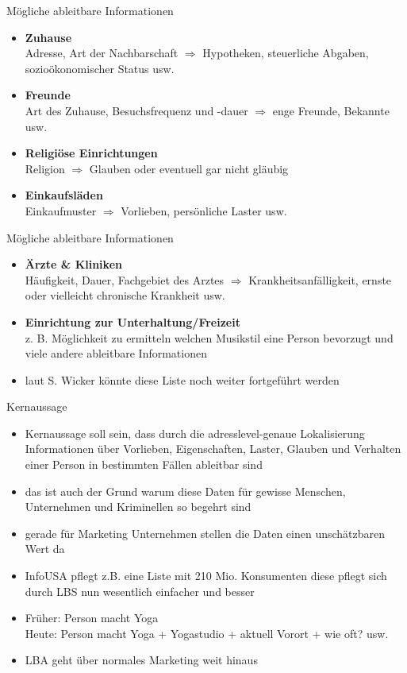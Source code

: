 \begin{frame}{Mögliche ableitbare Informationen}
  \begin{itemize}
  \item \textbf{Zuhause}\\
  Adresse, Art der Nachbarschaft $\Rightarrow$ Hypotheken, steuerliche Abgaben, sozioökonomischer Status usw.
  \item \textbf{Freunde}\\
  Art des Zuhause, Besuchsfrequenz und -dauer $\Rightarrow$ enge Freunde, Bekannte usw.
  \item \textbf{Religiöse Einrichtungen}\\
  Religion $\Rightarrow$ Glauben oder eventuell gar nicht gläubig
  \item \textbf{Einkaufsläden}\\
  Einkaufmuster $\Rightarrow$ Vorlieben, persönliche Laster usw.
  \end{itemize}
\end{frame}

\begin{frame}{Mögliche ableitbare Informationen}
  \begin{itemize}
  \item \textbf{Ärzte \& Kliniken}\\
  Häufigkeit, Dauer, Fachgebiet des Arztes $\Rightarrow$ Krankheitsanfälligkeit, ernste oder
  vielleicht chronische Krankheit usw.
  \item \textbf{Einrichtung zur Unterhaltung/Freizeit}\\
  z. B. Möglichkeit zu ermitteln welchen Musikstil eine Person bevorzugt und viele andere ableitbare Informationen
  \item laut S. Wicker könnte diese Liste noch weiter fortgeführt werden
  \end{itemize}
\end{frame}

\begin{frame}{Kernaussage}
  \begin{itemize}
  \item Kernaussage soll sein, dass durch die adresslevel-genaue Lokalisierung Informationen über Vorlieben,
  Eigenschaften, Laster, Glauben und Verhalten einer Person in bestimmten Fällen ableitbar sind
  \item das ist auch der Grund warum diese Daten für gewisse Menschen, Unternehmen und Kriminellen so begehrt sind
  \item gerade für Marketing Unternehmen stellen die Daten einen unschätzbaren Wert da
  \item InfoUSA pflegt z.B. eine Liste mit 210 Mio. Konsumenten diese pflegt sich durch LBS nun wesentlich einfacher und besser
  \item Früher: Person macht Yoga\\
  Heute: Person macht Yoga + Yogastudio + aktuell Vorort + wie oft? usw.
  \item LBA geht über normales Marketing weit hinaus
  \end{itemize}
\end{frame}

